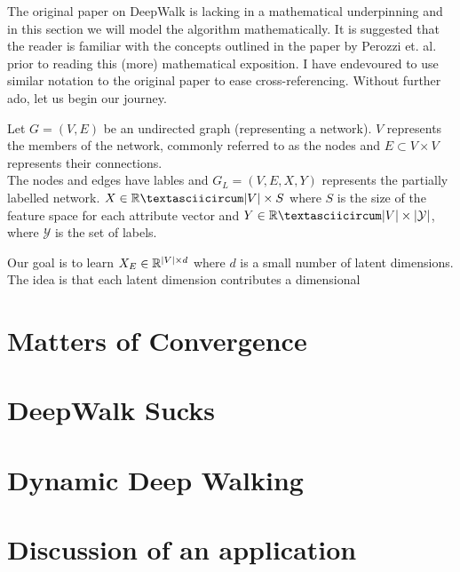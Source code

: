 \documentclass[a4paper]{article}
\begin{document}
The original paper on DeepWalk is lacking in a mathematical underpinning and in
this section we will model the algorithm mathematically. It is suggested that the reader
is familiar with the concepts outlined in the paper by Perozzi et. al. prior to
reading this (more) mathematical exposition. I have endevoured to use similar
notation to the original paper to ease cross-referencing. Without further ado, let us begin
our journey.

\begin{definition}
Let $G = (V, E)$ be an undirected graph (representing a network). $V$ represents the
members of the network, commonly referred to as the nodes and $E \subset V
\times V$ represents their connections.\\

The nodes and edges have lables and $G_L = (V, E, X, Y)$ represents the
partially labelled network. $X \in \R ˆ{|V| \times S}$ where $S$ is the size of
the feature space for each attribute vector and $Y \in \R ˆ{|V| \times
  |\mathcal{Y}|}$, where $\mathcal{Y}$ is the set of labels.
\end{definition}

Our goal is to learn $X_E \in \R ^{|V| \times d}$ where $d$ is a small number
of latent dimensions. The idea is that each latent dimension contributes a 
dimensional 
\section{Matters of Convergence}
\section{DeepWalk Sucks}
\section{Dynamic Deep Walking}
\section{Discussion of an application}
\end{document}
